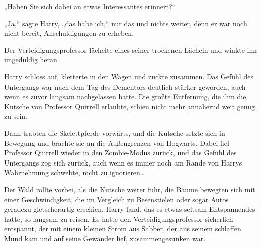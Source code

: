 „Haben Sie sich dabei an etwas Interessantes erinnert?“

„Ja,“ sagte Harry, „das habe ich,“ nur das und nichts weiter, denn er war noch nicht bereit, Anschuldigungen zu erheben.

Der Verteidigungsprofessor lächelte eines seiner trockenen Lächeln und winkte ihn ungeduldig heran.

Harry schloss auf, kletterte in den Wagen und zuckte zusammen. Das Gefühl des Untergangs war nach dem Tag des Dementors deutlich stärker geworden, auch wenn es zuvor langsam nachgelassen hatte. Die größte Entfernung, die ihm die Kutsche von Professor Quirrell erlaubte, schien nicht mehr annähernd weit genug zu sein.

Dann trabten die Skelettpferde vorwärts, und die Kutsche setzte sich in Bewegung und brachte sie an die Außengrenzen von Hogwarts. Dabei fiel Professor Quirrell wieder in den Zombie-Modus zurück, und das Gefühl des Untergangs zog sich zurück, auch wenn es immer noch am Rande von Harrys Wahrnehmung schwebte, nicht zu ignorieren…

Der Wald rollte vorbei, als die Kutsche weiter fuhr, die Bäume bewegten sich mit einer Geschwindigkeit, die im Vergleich zu Besenstielen oder sogar Autos geradezu gletscherartig erschien. Harry fand, das es etwas seltsam Entspannendes hatte, so langsam zu reisen. Es hatte den Verteidigungsprofessor sicherlich entspannt, der mit einem kleinen Strom aus Sabber, der aus seinem schlaffen Mund kam und auf seine Gewänder lief, zusammengesunken war.

